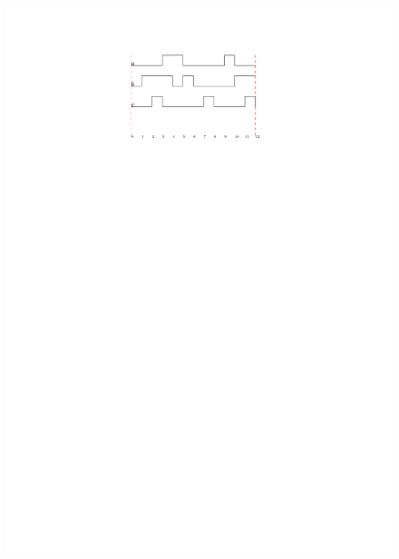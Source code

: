 \begin{enumerate}
	\begin{figure}[h]
		\centering
		\includegraphics[width=1\textwidth]{fig/Q6.pdf}
		\label{fig:Q6_b}
	\end{figure}
	
\end{enumerate}